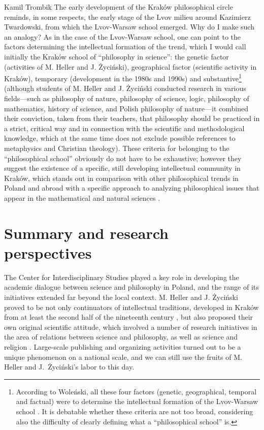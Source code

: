 \begin{artengenv}{Kamil Trombik}
The early development of the Kraków philosophical circle reminds, in some respects, the early stage of the Lvov milieu
around Kazimierz Twardowski, from which the Lvov-Warsaw school emerged. Why do I make such an analogy? As in the case
of the Lvov{}-Warsaw school, one can point to the factors determining the intellectual formation of the trend, which I
would call initially the Kraków school of ``philosophy in science'': the genetic factor (activities of M. Heller and J.
Życiński), geographical factor (scientific activity in Kraków), temporary (development in the 1980s and 1990s) and
substantive\footnote{According to Woleński, all these four factors (genetic, geographical, temporal and factual) were
to determine the intellectual formation of the Lvov-Warsaw school
\parencite{wolenski_filozoficzna_1985}.
It is
debatable whether these criteria are not too broad, considering also the difficulty of clearly defining what a
``philosophical school'' is.} (although students of M. Heller and J. Życiński conducted research in various fields---such
as philosophy of nature, philosophy of science, logic, philosophy of mathematics, history of science, and Polish
philosophy of nature---it combined their conviction, taken from their teachers, that philosophy should be practiced in a
strict, critical way and in connection with the scientific and methodological knowledge, which at the same time does
not exclude possible references to metaphysics and Christian theology). These criteria for belonging to the
``philosophical school'' obviously do not have to be exhaustive; however they suggest the existence of a specific, still
developing intellectual community in Kraków, which stands out in comparison with other philosophical trends in Poland
and abroad with a specific approach to analyzing philosophical issues that appear in the mathematical and natural
sciences
\parencite{heller_jak_1986,heller_how_2019}.

\section{Summary and research perspectives}

The Center for Interdisciplinary Studies played a key role in developing the academic dialogue between science and
philosophy in Poland, and the range of its initiatives extended far beyond the local context. M. Heller and J. Życiński
proved to be not only continuators of intellectual traditions, developed in Kraków from at least the second half of the
nineteenth century
\parencite{polak_19th_2013},
but also proposed their own original scientific attitude,
which involved a number of research initiatives in the area of relations between science and philosophy, as well as
science and religion
\parencite{polak_philosophy_2019}.
Large-scale publishing and organizing activities turned
out to be a unique phenomenon on a national scale, and we can still use the fruits of M. Heller and J.~Życiński's labor
to this day.


\end{artengenv}
